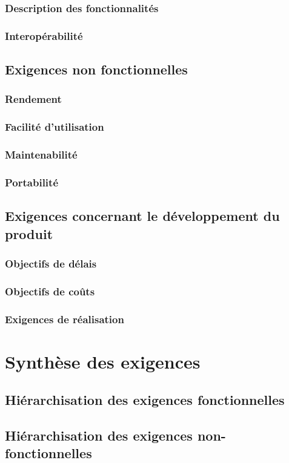 \documentclass[majeure,gl]{tb}
\begin{document}
\subsubsection{Description des fonctionnalités}


\subsubsection{Interopérabilité}

\subsection{Exigences non fonctionnelles}
\label{nonfonc}

\subsubsection{Rendement}

\subsubsection{Facilité d'utilisation}


\subsubsection{Maintenabilité}


\subsubsection{Portabilité}

\subsection{Exigences concernant le développement du produit}
\label{exigences}

\subsubsection{Objectifs de délais}

\subsubsection{Objectifs de coûts}

\subsubsection{Exigences de réalisation}

\section{Synthèse des exigences}

\subsection{Hiérarchisation des exigences fonctionnelles} 
\label{sec:hiera}


\subsection{Hiérarchisation des exigences non-fonctionnelles} 
\end{document}
